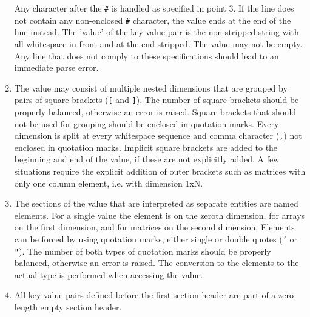 \begin{enumerate}
Any character after the \texttt{\#} is handled as specified in point 3.
If the line does not contain any non-enclosed \texttt{\#} character, the value ends at the end of the line instead.
The 'value' of the key-value pair is the non-stripped string with all whitespace in front and at the end stripped.
The value may not be empty.
Any line that does not comply to these specifications should lead to an immediate parse error.
\item The value may consist of multiple nested dimensions that are grouped by pairs of square brackets (\texttt{[} and \texttt{]}).
The number of square brackets should be properly balanced, otherwise an error is raised.
Square brackets that should not be used for grouping should be enclosed in quotation marks.
Every dimension is split at every whitespace sequence and comma character (\texttt{,}) not enclosed in quotation marks.
Implicit square brackets are added to the beginning and end of the value, if these are not explicitly added.
A few situations require the explicit addition of outer brackets such as matrices with only one column element, i.e. with dimension 1xN.
\item The sections of the value that are interpreted as separate entities are named elements.
For a single value the element is on the zeroth dimension, for arrays on the first dimension, and for matrices on the second dimension.
Elements can be forced by using quotation marks, either single or double quotes (\texttt{'} or \texttt{"}).
The number of both types of quotation marks should be properly balanced, otherwise an error is raised.
The conversion to the elements to the actual type is performed when accessing the value.
\item All key-value pairs defined before the first section header are part of a zero-length empty section header.
\end{enumerate}

